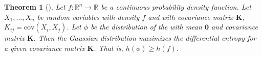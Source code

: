 \documentclass{article}
\newcommand{\mv}[1]{\mathbf{#1}}	%
\newcommand{\cov}{\mathrm{cov}}
\begin{document}
\newtheorem{thm}{Theorem}
\begin{thm}[]
Let $f:\mathbb{R}^n \to \mathbb{R}$ be a continuous probability
density function. Let $X_1, \ldots, X_n$ be random variables with density $f$
and with covariance matrix $\mv{K}$, $K_{ij} = \cov(X_i, X_j)$.  Let $\phi$ be the distribution of the 
  with mean $\mv{0}$ and covariance matrix $\mv{K}$.  Then the  Gaussian distribution maximizes the differential entropy for a given covariance matrix $\mv{K}$.  That is, $h(\phi) \ge h(f)$.
\end{thm}
\end{document}
